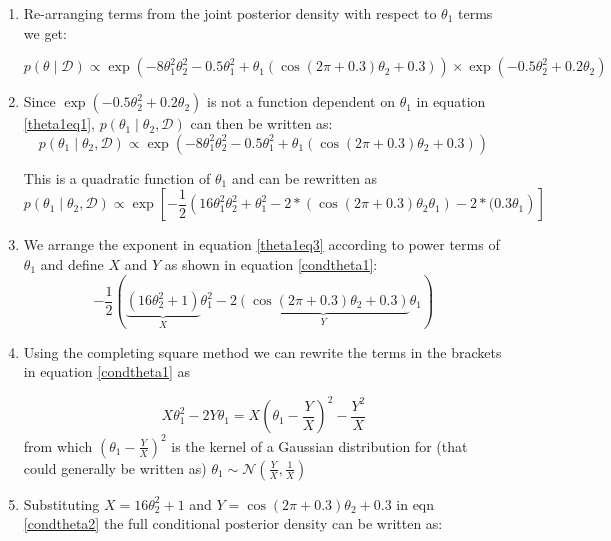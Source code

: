 \documentclass[12pt]{article}
\begin{document}
\begin{enumerate}
\item Re-arranging terms from the joint posterior density with respect to $\theta_1$ terms we get:

\begin{equation}\label{theta1eq1}
p(\theta \mid \mathcal{D}) \propto \exp \left( -8\theta_1^2\theta_2^2 - 0.5\theta_1^2 + \theta_1(\cos(2\pi + 0.3)\theta_2 + 0.3) \right) \times \exp \left( -0.5\theta_2^2 + 0.2\theta_2 \right)  
\end{equation} 
\item Since  $\exp \left( -0.5\theta_2^2 + 0.2\theta_2 \right)$  is not a function dependent on $\theta_1$ in equation  \ref{theta1eq1}, $p(\theta_1 \mid \theta_2 ,\mathcal{D}) $ can then be written as:
 \begin{equation}\label{theta1eq2}
p(\theta_1 \mid \theta_2 ,\mathcal{D}) \propto \exp \left( -8\theta_1^2\theta_2^2 - 0.5\theta_1^2 + \theta_1(\cos(2\pi + 0.3)\theta_2 + 0.3) \right)
\end{equation} 

This is a quadratic function of $\theta_1$ and can be rewritten as   \begin{equation}\label{theta1eq3}
p(\theta_1 \mid \theta_2 ,\mathcal{D}) \propto \exp\left[- \frac{1}{2}\left( 16\theta_1^2\theta_2^2 + \theta_1^2 - 2*(\cos(2\pi + 0.3)\theta_2 \theta_1) - 2*(0.3\theta_1 \right)\right]
\end{equation} 

\item We arrange the exponent in equation \ref{theta1eq3} according to power terms of $\theta_1$ and define $X$ and $Y$ as shown in equation \ref{condtheta1}:
\begin{equation}\label{condtheta1}
-\frac{1}{2} \left( \underbrace{(16\theta_2^2 + 1)}_{X}\theta_1^2 - 2\underbrace{\left(\cos(2\pi + 0.3)\theta_2 + 0.3\right)}_{Y}\theta_1 \right)
\end{equation}

\item Using the completing square method we can rewrite the terms in the brackets in equation \ref{condtheta1} as 

\begin{equation}\label{condtheta2}
     X\theta_1^2 - 2Y\theta_1 = X\left(\theta_1 - \frac{Y}{X}\right)^2 - \frac{Y^2}{X}
\end{equation} from which $\left(\theta_1 - \frac{Y}{X}\right)^2$ is the kernel of a Gaussian distribution for (that could generally be written as)  $\theta_1 \sim \mathcal{N} \left(\frac{Y}{X}, \frac{1}{X} \right)$
\item Substituting \( X = 16\theta_2^2 + 1 \) and \( Y = \cos(2\pi + 0.3)\theta_2 + 0.3 \) in eqn \ref{condtheta2} the full conditional posterior density  can be written as:


\end{enumerate}
\end{document}
